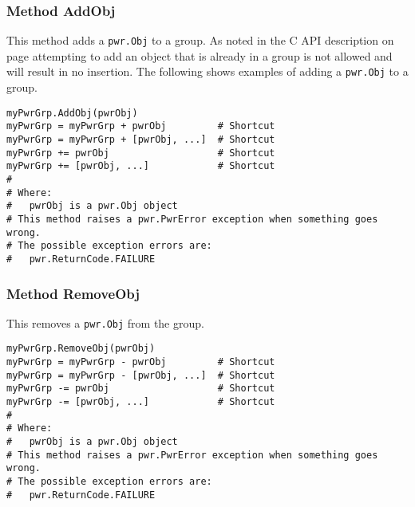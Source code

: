 \documentclass[12pt]{report} %
\begin{document}
\begin{appendices}
\subsubsection{Method AddObj} \label{meth:AddObj}

This method adds a \texttt{pwr.Obj} to a group. As noted in the C API
description on page \pageref{func:GrpAddObj} attempting to add an object that
is already in a group is not allowed and will result in no insertion.  The
following shows examples of adding a \texttt{pwr.Obj} to a group.

\begin{center}\begin{minipage}{.95\linewidth}\begin{lstlisting}
myPwrGrp.AddObj(pwrObj)
myPwrGrp = myPwrGrp + pwrObj         # Shortcut
myPwrGrp = myPwrGrp + [pwrObj, ...]  # Shortcut
myPwrGrp += pwrObj                   # Shortcut
myPwrGrp += [pwrObj, ...]            # Shortcut
#
# Where:
#   pwrObj is a pwr.Obj object
# This method raises a pwr.PwrError exception when something goes wrong.
# The possible exception errors are:
#   pwr.ReturnCode.FAILURE
\end{lstlisting}\end{minipage}\end{center}

\subsubsection{Method RemoveObj} \label{meth:RemoveObj}

This removes a \texttt{pwr.Obj} from the group.

\begin{center}\begin{minipage}{.95\linewidth}\begin{lstlisting}
myPwrGrp.RemoveObj(pwrObj)
myPwrGrp = myPwrGrp - pwrObj         # Shortcut
myPwrGrp = myPwrGrp - [pwrObj, ...]  # Shortcut
myPwrGrp -= pwrObj                   # Shortcut
myPwrGrp -= [pwrObj, ...]            # Shortcut
#
# Where:
#   pwrObj is a pwr.Obj object
# This method raises a pwr.PwrError exception when something goes wrong.
# The possible exception errors are:
#   pwr.ReturnCode.FAILURE
\end{lstlisting}\end{minipage}\end{center}


\end{appendices}
\end{document}
